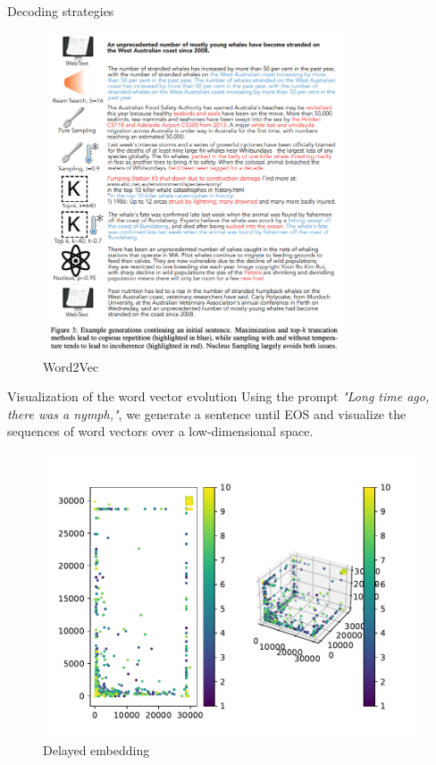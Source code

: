 \documentclass{beamer}
\begin{document}
\begin{frame}{Decoding strategies}
	\begin{figure}
		\centering
		\includegraphics[width=0.8\textwidth]{fig/decoding.png}
		\caption{Word2Vec}
	\end{figure}
\end{frame}

\begin{frame}{Visualization of the word vector evolution}
	Using the prompt \textit{"Long time ago, there was a nymph,"}, we generate a sentence until EOS and visualize
	the sequences of word vectors over a low-dimensional space.
	\begin{figure}[ht]
		\includegraphics[width=.7\textwidth]{fig/delay_1.pdf}
		\caption{Delayed embedding}
	\end{figure}
\end{frame}
\end{document}
